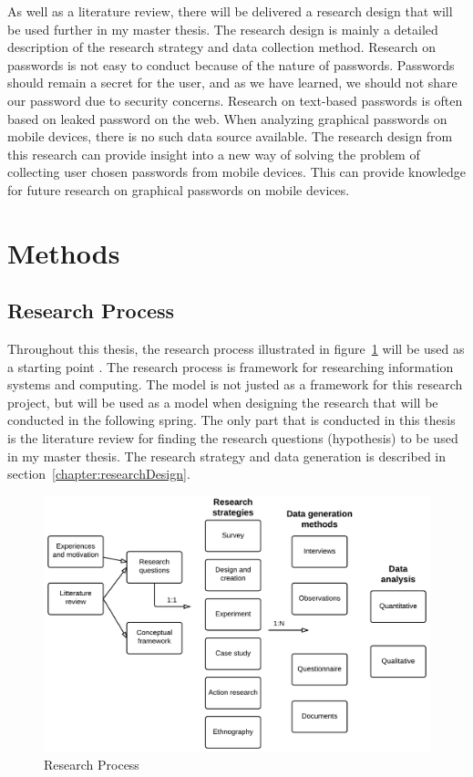     As well as a literature review, there will be delivered a research design that will be used further in my master thesis. The research design is mainly a detailed description of the research strategy and data collection method. Research on passwords is not easy to conduct because of the nature of passwords. Passwords should remain a secret for the user, and as we have learned, we should not share our password due to security concerns. Research on text-based passwords is often based on leaked password on the web. When analyzing graphical passwords on mobile devices, there is no such data source available. 
    The research design from this research can provide insight into a new way of solving the problem of collecting user chosen passwords from mobile devices. This can provide knowledge for future research on graphical passwords on mobile devices.

  \section{Methods}

    \subsection{Research Process}

    Throughout this thesis, the research process illustrated in figure~\ref{fig:researchProcess1} will be used as a starting point \cite{empiriske}. The research process is framework for researching information systems and computing. The model is not justed as a framework for this research project, but will be used as a model when designing the research that will be conducted in the following spring. The only part that is conducted in this thesis is the literature review for finding the research questions (hypothesis) to be used in my master thesis. The research strategy and data generation is described in section~\ref{chapter:researchDesign}.

      \begin{figure}[H]
        \centering
        \includegraphics[scale=0.18]{pics/ResearchProcess.png}
        \caption[Research process]{Research Process \cite{empiriske}}
        \label{fig:researchProcess1}
      \end{figure}

